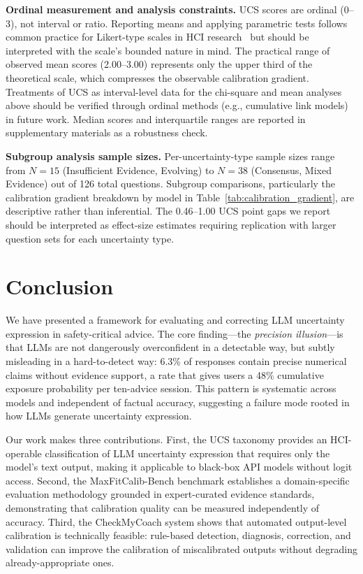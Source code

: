 \documentclass[manuscript, review, anonymous]{acmart}
\begin{document}
\textbf{Ordinal measurement and analysis constraints.} UCS scores are ordinal (0--3), not interval or ratio. Reporting means and applying parametric tests follows common practice for Likert-type scales in HCI research~\cite{bucinca2021trust} but should be interpreted with the scale's bounded nature in mind. The practical range of observed mean scores (2.00--3.00) represents only the upper third of the theoretical scale, which compresses the observable calibration gradient. Treatments of UCS as interval-level data for the chi-square and mean analyses above should be verified through ordinal methods (e.g., cumulative link models) in future work. Median scores and interquartile ranges are reported in supplementary materials as a robustness check.

\textbf{Subgroup analysis sample sizes.} Per-uncertainty-type sample sizes range from $N = 15$ (Insufficient Evidence, Evolving) to $N = 38$ (Consensus, Mixed Evidence) out of 126 total questions. Subgroup comparisons, particularly the calibration gradient breakdown by model in Table~\ref{tab:calibration_gradient}, are descriptive rather than inferential. The 0.46--1.00 UCS point gaps we report should be interpreted as effect-size estimates requiring replication with larger question sets for each uncertainty type.

\section{Conclusion}
\label{sec:conclusion}

We have presented a framework for evaluating and correcting LLM uncertainty expression in safety-critical advice. The core finding---the \emph{precision illusion}---is that LLMs are not dangerously overconfident in a detectable way, but subtly misleading in a hard-to-detect way: 6.3\% of responses contain precise numerical claims without evidence support, a rate that gives users a 48\% cumulative exposure probability per ten-advice session. This pattern is systematic across models and independent of factual accuracy, suggesting a failure mode rooted in how LLMs generate uncertainty expression.

Our work makes three contributions. First, the UCS taxonomy provides an HCI-operable classification of LLM uncertainty expression that requires only the model's text output, making it applicable to black-box API models without logit access. Second, the MaxFitCalib-Bench benchmark establishes a domain-specific evaluation methodology grounded in expert-curated evidence standards, demonstrating that calibration quality can be measured independently of accuracy. Third, the CheckMyCoach system shows that automated output-level calibration is technically feasible: rule-based detection, diagnosis, correction, and validation can improve the calibration of miscalibrated outputs without degrading already-appropriate ones.
\end{document}
